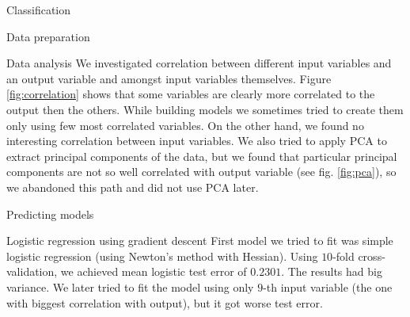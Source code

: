 \documentclass{article}
\begin{document}
\begin{section}{Classification}
\begin{subsection}{Data preparation}
\end{subsection}
\begin{subsection}{Data analysis}
We investigated correlation between different input variables and an output variable and amongst input variables themselves. Figure \ref{fig:correlation} shows that some variables are clearly more correlated to the output then the others. While building models we sometimes tried to create them only using few most correlated variables. On the other hand, we found no interesting correlation between input variables. We also tried to apply PCA to extract principal components of the data, but we found that particular principal components are not so well correlated with output variable (see fig. \ref{fig:pca}), so we abandoned this path and did not use PCA later.

\begin{figure}[!t]
\center
{}
\hfill
{}
\caption{}
\end{figure}

\end{subsection}
\begin{subsection}{Predicting models}
\begin{subsubsection}{Logistic regression using gradient descent}
First model we tried to fit was simple logistic regression (using Newton's method with Hessian). Using $10$-fold cross-validation, we achieved mean logistic test error of $0.2301$. The results had big variance. We later tried to fit the model using only $9$-th input variable (the one with biggest correlation with output), but it got worse test error.


\end{subsubsection}
\end{subsection}
\end{section}
\end{document}

